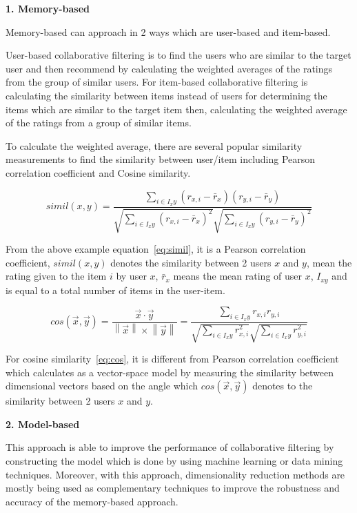 \documentclass[12pt,oneside,openright,a4paper]{cpe-english-project}
\begin{document}
\textbf{1. Memory-based}\par

Memory-based can approach in 2 ways which are user-based and item-based.

User-based collaborative filtering is to find the users who are similar to the target user and then recommend by calculating the weighted averages of the ratings from the group of similar users. For item-based collaborative filtering is calculating the similarity between items instead of users for determining the items which are similar to the target item then, calculating the weighted average of the ratings from a group of similar items.

To calculate the weighted average, there are several popular similarity measurements to find the similarity between user/item including Pearson correlation coefficient and Cosine similarity.

\begin{equation}\label{eq:simil}
simil(x, y) = \frac{\sum_{i\in I_xy}^{}(r_{x,i}-\bar{r}_{x})(r_{y,i}-\bar{r}_{y})}
{\sqrt{\sum_{i\in I_xy}^{}(r_{x,i}-\bar{r}_{x})^2}\sqrt{\sum_{i\in I_xy}^{}(r_{y,i}-\bar{r}_{y})^2}}
\end{equation}

From the above example equation~\ref{eq:simil}, it is a Pearson correlation coefficient, $simil(x, y)$ denotes the similarity between 2 users $x$ and $y$, mean the rating given to the item $i$ by user $x$, $\bar{r}_{x}$ means the mean rating of user $x$, $I_{xy}$ and is equal to a total number of items in the user-item.


\begin{equation}\label{eq:cos}
cos(\vec{x},\vec{y}) 
=\frac{\vec{x}\cdot \vec{y}}{\left \| \vec{x} \right \|\times \left \| \vec{y} \right \|}
=\frac{\sum_{i\in I_xy}^{}r_{x,i}r_{y,i}}
{\sqrt{\sum_{i\in I_xy}^{}r_{x,i}^2}\sqrt{\sum_{i\in I_xy}^{}r_{y,i}^2}}
\end{equation}

For cosine similarity~\ref{eq:cos}, it is different from Pearson correlation coefficient which calculates as a vector-space model by measuring the similarity between dimensional vectors based on the angle which $cos(\vec{x},\vec{y})$ denotes to the similarity between 2 users $x$ and $y$.


\textbf{2. Model-based}\par

This approach is able to improve the performance of collaborative filtering by constructing the model which is done by using machine learning or data mining techniques. Moreover, with this approach, dimensionality reduction methods are mostly being used as complementary techniques to improve the robustness and accuracy of the memory-based approach. \cite{Recommendersystem}
\end{document}
